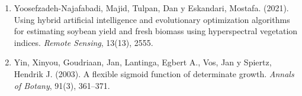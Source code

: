 \documentclass[
11pt, %
]{charter}
\begin{document}
\begin{enumerate}
    \item Yoosefzadeh-Najafabadi, Majid, Tulpan, Dan y Eskandari, Mostafa. (2021). Using hybrid artificial intelligence and evolutionary optimization algorithms for estimating soybean yield and fresh biomass using hyperspectral vegetation indices. \emph{Remote Sensing}, 13(13), 2555.

    \item Yin, Xinyou, Goudriaan, Jan, Lantinga, Egbert A., Vos, Jan y Spiertz, Hendrik J. (2003). A flexible sigmoid function of determinate growth. \emph{Annals of Botany}, 91(3), 361–371.

\end{enumerate}
\end{document}
